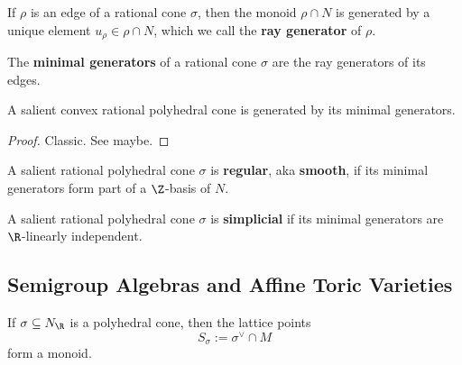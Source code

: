 \begin{definition}
  \label{1-2-ray-gen}

  If $\rho$ is an edge of a rational cone $\sigma$, then the monoid $\rho \cap N$ is generated by a unique element $u_\rho \in \rho \cap N$, which we call the {\bf ray generator} of $\rho$.
\end{definition}


\begin{definition}
  \label{1-2-min-gen}

  The {\bf minimal generators} of a rational cone $\sigma$ are the ray generators of its edges.
\end{definition}


\begin{lemma}
  \label{05-cone-hull-min-gen}

  A salient convex rational polyhedral cone is generated by its minimal generators.
\end{lemma}
\begin{proof}
  \uses{}

  Classic. See \cite{Oda_1988} maybe.
\end{proof}


\begin{definition}
  \label{06-reg-cone}

  A salient rational polyhedral cone $\sigma$ is {\bf regular}, aka {\bf smooth}, if its minimal generators form part of a $\Z$-basis of $N$.
\end{definition}


\begin{definition}
  \label{06-simplicial-cone}

  A salient rational polyhedral cone $\sigma$ is {\bf simplicial} if its minimal generators are $\R$-linearly independent.
\end{definition}


\subsection{Semigroup Algebras and Affine Toric Varieties}


\begin{definition}
  \label{07-dual-lat-cone}

  If $\sigma \subseteq N_\R$ is a polyhedral cone, then the lattice points
  \[
    S_\sigma := \sigma^\vee \cap M
  \]
  form a monoid.
\end{definition}


